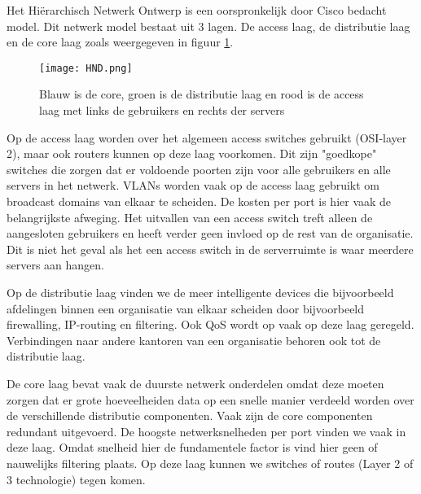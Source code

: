 Het Hi\"erarchisch Netwerk Ontwerp is een oorspronkelijk door Cisco bedacht model. Dit netwerk model bestaat uit 3 lagen. De access laag, de distributie laag en de core laag zoals weergegeven in figuur \ref{HND}.

\begin{figure}[H]
\centering
\texttt{[image: HND.png]}
\caption{Blauw is de core, groen is de distributie laag en rood is de access laag met links de gebruikers en rechts der servers}
\label{HND}
\end{figure}

Op de access laag worden over het algemeen access switches gebruikt (OSI-layer 2), maar ook routers kunnen op deze laag voorkomen. Dit zijn "goedkope" switches die zorgen dat er voldoende poorten zijn voor alle gebruikers en alle servers in het netwerk. VLANs worden vaak op de access laag gebruikt om broadcast domains van elkaar te scheiden. De kosten per port is hier vaak de belangrijkste afweging. Het uitvallen van een access switch treft alleen de aangesloten gebruikers en heeft verder geen invloed op de rest van de organisatie. Dit is niet het geval als het een access switch in de serverruimte is waar meerdere servers aan hangen.

Op de distributie laag vinden we de meer intelligente devices die bijvoorbeeld afdelingen binnen een organisatie van elkaar scheiden door bijvoorbeeld firewalling, IP-routing en filtering. Ook QoS wordt op vaak op deze laag geregeld. Verbindingen naar andere kantoren van een organisatie behoren ook tot de distributie laag. 

De core laag bevat vaak de duurste netwerk onderdelen omdat deze moeten zorgen dat er grote hoeveelheiden data op een snelle manier verdeeld worden over de verschillende distributie componenten. Vaak zijn de core componenten redundant uitgevoerd. De hoogste netwerksnelheden per port vinden we vaak in deze laag. Omdat snelheid hier de fundamentele factor is vind hier geen of nauwelijks filtering plaats. Op deze laag kunnen we switches of routes (Layer 2 of 3 technologie) tegen komen.

